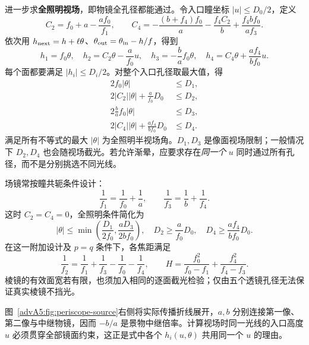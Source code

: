 \begin{advsolution}
进一步求\textbf{全照明视场}，即物镜全孔径都能通过。令入口瞳坐标 $|u|\le D_0/2$，定义
\[
 C_2=f_0+a-\frac{af_0}{f_1},\qquad
 C_4=-\frac{(b+f_4)f_0}{a}-\frac{f_4 C_2}{b}
       +\frac{f_4bf_0}{af_3}.
\]
依次用 $h_{\rm next}=h+\ell\theta$、$\theta_{\rm out}=\theta_{\rm in}-h/f$，得到
\[
 h_1=f_0\theta,\quad h_2=C_2\theta-\frac a{f_0}u,\quad
 h_3=-\frac ba f_0\theta,\quad
 h_4=C_4\theta+\frac{af_4}{bf_0}u.
\]
每个面都要满足 $|h_i|\le D_i/2$。对整个入口孔径取最大值，得
\[
\begin{split}
 2f_0|\theta|&\le D_1,\\
 2|C_2||\theta|+\frac a{f_0}D_0&\le D_2,\\
 2\frac ba f_0|\theta|&\le D_3,\\
 2|C_4||\theta|+\frac{af_4}{bf_0}D_0&\le D_4.
\end{split}
\]
满足所有不等式的最大 $|\theta|$ 为全照明半视场角。$D_1,D_3$ 是像面视场限制；一般情况下 $D_2,D_4$ 也会随视场截光。若允许渐晕，应要求存在\emph{同一个} $u$ 同时通过所有孔径，而不是分别挑选不同光线。

场镜常按瞳共轭条件设计：
\[
 \frac1{f_1}=\frac1{f_0}+\frac1a,\qquad
 \frac1{f_3}=\frac1b+\frac1{f_4}.
\]
这时 $C_2=C_4=0$，全照明条件简化为
\[
 |\theta|\le\min\left(\frac{D_1}{2f_0},\frac{aD_3}{2bf_0}\right),\quad
 D_2\ge\frac a{f_0}D_0,\quad D_4\ge\frac{af_4}{bf_0}D_0.
\]
在这一附加设计及 $p=q$ 条件下，各焦距满足
\[
 \frac1{f_2}=\frac1{f_1}+\frac1{f_3}-\frac1{f_0}-\frac1{f_4},\qquad
 H=\frac{f_0^2}{f_0-f_1}+\frac{f_4^2}{f_4-f_3}.
\]
棱镜的有效面宽若有限，也须加入相同的逐面截光检验；仅由五个透镜孔径无法保证真实棱镜不挡光。

图~\ref{advA5:fig:periscope-source}右侧将实际传播折线展开，$a,b$ 分别连接第一像、第二像与中继物镜，因而 $-b/a$ 是景物中继倍率。计算视场时同一光线的入口高度 $u$ 必须贯穿全部镜面约束，这正是式中各个 $h_i(u,\theta)$ 共用同一个 $u$ 的理由。
\end{advsolution}
